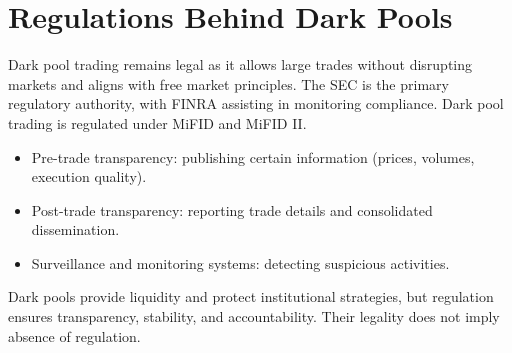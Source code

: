 \section{Regulations Behind Dark Pools}
Dark pool trading remains legal as it allows large trades without disrupting markets and aligns with free market principles. The SEC is the primary regulatory authority, with FINRA assisting in monitoring compliance. Dark pool trading is regulated under MiFID and MiFID II. 
\begin{itemize}
    \item Pre-trade transparency: publishing certain information (prices, volumes, execution quality).
    \item Post-trade transparency: reporting trade details and consolidated dissemination.
    \item Surveillance and monitoring systems: detecting suspicious activities.
\end{itemize}
Dark pools provide liquidity and protect institutional strategies, but regulation ensures transparency, stability, and accountability. Their legality does not imply absence of regulation.
